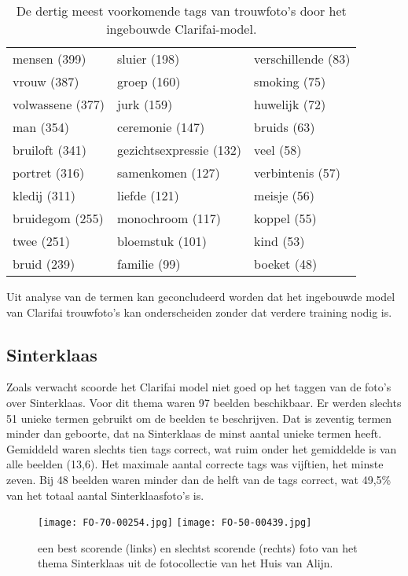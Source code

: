 \begin{table}
	\centering
	\begin{tabular}{*{3}{l}}
		mensen (399) & sluier (198) & verschillende (83) \\
		vrouw (387) & groep (160) & smoking (75) \\
		volwassene (377) & jurk (159) & huwelijk (72) \\
		man (354) & ceremonie (147) & bruids (63) \\
		bruiloft (341) & gezichtsexpressie (132) & veel (58) \\
		portret (316) & samenkomen (127) & verbintenis (57) \\
		kledij (311) & liefde (121) & meisje (56) \\
		bruidegom (255) & monochroom (117) & koppel (55) \\
		twee (251) & bloemstuk (101) & kind (53) \\
		bruid (239) & familie (99) & boeket (48) \\	
	\end{tabular}
	\caption[Dertig meest voorkomende tags van huwelijksfoto's door het ingebouwde model]{De dertig meest voorkomende tags van trouwfoto's door het ingebouwde Clarifai-model.}
	\label{tab:30-termen-huwelijk}
\end{table}

Uit analyse van de termen kan geconcludeerd worden dat het ingebouwde model van Clarifai trouwfoto’s kan onderscheiden zonder dat verdere training nodig is.

\subsection{Sinterklaas}

Zoals verwacht scoorde het Clarifai model niet goed op het taggen van de foto’s over Sinterklaas. Voor dit thema waren 97 beelden beschikbaar. Er werden slechts 51 unieke termen gebruikt om de beelden te beschrijven. Dat is zeventig termen minder dan geboorte, dat na Sinterklaas de minst aantal unieke termen heeft. Gemiddeld waren slechts tien tags correct, wat ruim onder het gemiddelde is van alle beelden (13,6). Het maximale aantal correcte tags was vijftien, het minste zeven. Bij 48 beelden waren minder dan de helft van de tags correct, wat 49,5\% van het totaal aantal Sinterklaasfoto’s is.

\begin{figure}
	\centering
	\texttt{[image: FO-70-00254.jpg]}\hfill
	\texttt{[image: FO-50-00439.jpg]}\hfill
	\caption[Best en slechtst scorende foto van thema Sinterklaas]{een best scorende (links) en slechtst scorende (rechts) foto van het thema Sinterklaas uit de fotocollectie van het Huis van Alijn.}
\end{figure}

